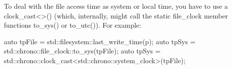 To deal with the file access time as system or local time, you have to use a clock\_cast<>() (which, internally, might call the static file\_clock member functions to\_sys() or to\_utc()). For example:

\begin{cpp}
auto tpFile = std::filesystem::last_write_time(p);
auto tpSys = std::chrono::file_clock::to_sys(tpFile);
auto tpSys = std::chrono::clock_cast<std::chrono::system_clock>(tpFile);
\end{cpp}











